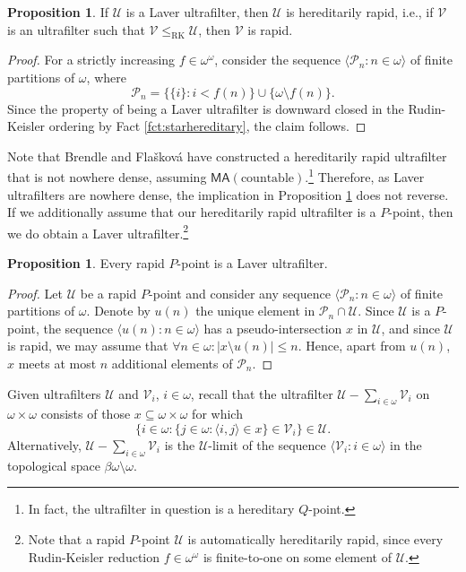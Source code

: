 \documentclass[12pt]{article}
\theoremstyle{definition}
\newtheorem{prp}[nummer]{\sc Proposition}
\begin{document}
\begin{prp}\label{prp:rapid}
If $\mathcal{U}$ is a Laver ultrafilter, then $\mathcal{U}$ is hereditarily rapid, i.e., if $\mathcal{V}$ is an ultrafilter such that $\mathcal{V}\leq_{\text{RK}}\mathcal{U}$, then $\mathcal{V}$ is rapid.
\end{prp}

\begin{proof}
For a strictly increasing $f \in \omega^\omega$, consider the sequence $\langle \mathcal{P}_n: n \in \omega\rangle$ of finite partitions of $\omega$, where
\[\mathcal{P}_n=\{\{i\}: i < f(n)\} \cup \{\omega \setminus f(n)\}.\]
Since the property of being a Laver ultrafilter is downward closed in the Rudin-Keisler ordering by Fact \ref{fct:starhereditary}, the claim follows.
\end{proof}

Note that Brendle and Fla\v{s}kov\'a \cite[Theorem 2.8]{brefla17} have constructed a hereditarily rapid ultrafilter that is not nowhere dense, assuming $\textsf{MA}(\text{countable})$.\footnote{In fact, the ultrafilter in question is a hereditary $Q$-point.} Therefore, as Laver ultrafilters are nowhere dense, the implication in Proposition \ref{prp:rapid} does not reverse. If we additionally assume that our hereditarily rapid ultrafilter is a $P$-point, then we do obtain a Laver ultrafilter.\footnote{Note that a rapid $P$-point $\mathcal{U}$ is automatically hereditarily rapid, since every Rudin-Keisler reduction $f\in \omega^\omega$ is finite-to-one on some element of $\mathcal{U}$.}

\begin{prp}\label{prp:semiselective}
Every rapid $P$-point is a Laver ultrafilter.
\end{prp}

\begin{proof}
Let $\mathcal{U}$ be a rapid $P$-point and consider any sequence $\langle \mathcal{P}_n: n \in \omega\rangle$ of finite partitions of $\omega$. Denote by $u(n)$ the unique element in $\mathcal{P}_n \cap \mathcal{U}$. Since $\mathcal{U}$ is a $P$-point, the sequence $\langle u(n): n \in \omega \rangle$ has a pseudo-intersection $x$ in $\mathcal{U}$, and since $\mathcal{U}$ is rapid, we may assume that $\forall n \in \omega: |x \setminus u(n)|\leq n$. Hence, apart from $u(n)$, $x$ meets at most $n$ additional elements of $\mathcal{P}_n$.
\end{proof}

Given ultrafilters $\mathcal{U}$ and $\mathcal{V}_i$, $i\in \omega$, recall that the ultrafilter $\mathcal{U}-\sum_{i\in \omega}\mathcal{V}_i$ on $\omega \times \omega$ consists of those $x\subseteq \omega \times \omega$ for which
\[\{i \in \omega: \{j\in \omega: \langle i,j\rangle\in x\}\in \mathcal{V}_i\}\in \mathcal{U}.\]
Alternatively, $\mathcal{U}-\sum_{i\in \omega}\mathcal{V}_i$ is the $\mathcal{U}$-limit of the sequence $\langle \mathcal{V}_i: i \in \omega\rangle$ in the topological space $\beta \omega \setminus \omega$.
\end{document}
